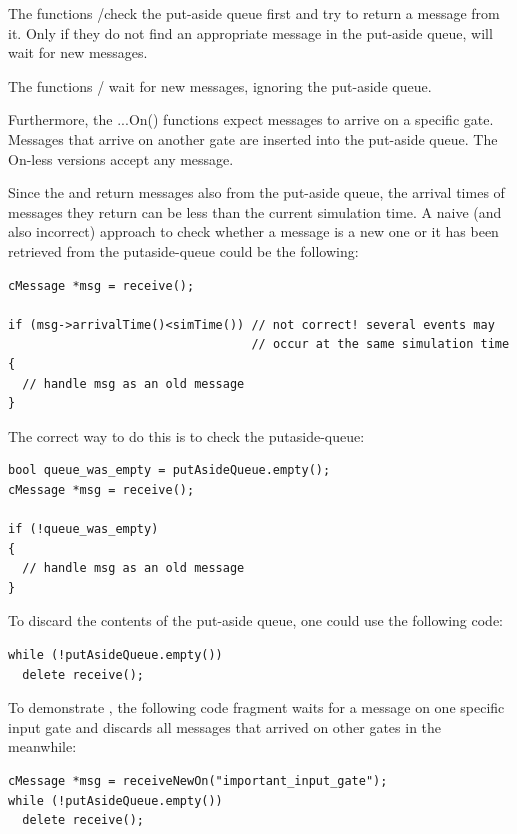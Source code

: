 The functions /check the put-aside queue
first and try to return a message from it. Only if they do not
find an appropriate message in the put-aside queue, will wait
for new messages.

The functions / wait for new messages,
ignoring the put-aside queue.

Furthermore, the ...On() functions expect messages to arrive on a
specific gate. Messages that arrive on another gate are inserted into
the put-aside queue. The On-less versions accept any message.

Since the  and  return messages
also from the put-aside queue, the arrival times of messages they
return can be less than the current simulation time. A naive (and also
incorrect) approach to check whether a message is a new one or it has
been retrieved from the putaside-queue could be the following:

\begin{verbatim}
cMessage *msg = receive();

if (msg->arrivalTime()<simTime()) // not correct! several events may
                                  // occur at the same simulation time
{
  // handle msg as an old message
}
\end{verbatim}


The correct way to do this is to check the putaside-queue:

\begin{verbatim}
bool queue_was_empty = putAsideQueue.empty();
cMessage *msg = receive();

if (!queue_was_empty)
{
  // handle msg as an old message
}
\end{verbatim}


To discard the contents of the put-aside queue, one could use
the following code:

\begin{verbatim}
while (!putAsideQueue.empty())
  delete receive();
\end{verbatim}


To demonstrate , the following code fragment waits
for a message on one specific input gate and discards all messages
that arrived on other gates in the meanwhile:

\begin{verbatim}
cMessage *msg = receiveNewOn("important_input_gate");
while (!putAsideQueue.empty())
  delete receive();
\end{verbatim}


